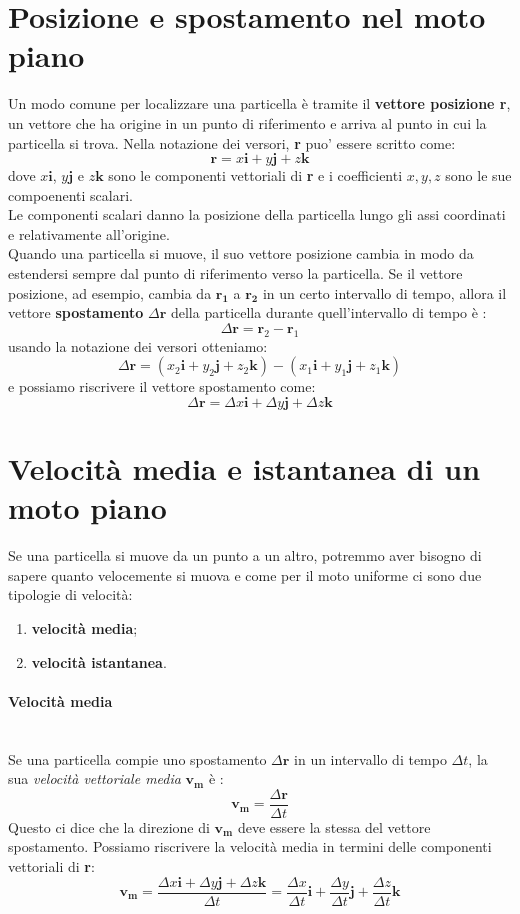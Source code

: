 \documentclass[12pt]{report}
\begin{document}
	\section{Posizione e spostamento nel moto piano}
	Un modo comune per localizzare una particella è  tramite il \textbf{vettore posizione r}, un vettore che ha origine in un punto di riferimento e arriva al punto in cui la particella si trova. Nella notazione dei versori, \textbf{r} puo' essere scritto come:
	\[
	\textbf{r} = x\textbf{i} + y\textbf{j} + z\textbf{k}
	\]
	dove $x\textbf{i}$, $y\textbf{j}$ e $z\textbf{k}$ sono le componenti vettoriali di \textbf{r} e i coefficienti $x, y, z$ sono le sue compoenenti scalari. \\
	Le componenti scalari danno la posizione della particella lungo gli assi coordinati e relativamente all'origine.\\
	Quando una particella si muove, il suo vettore posizione cambia in modo da estendersi sempre dal punto di riferimento verso la particella. Se il vettore posizione, ad esempio, cambia da $\mathbf{r_1}$ a $\mathbf{r_2}$ in un certo intervallo di tempo, allora il vettore \textbf{spostamento} $\Delta\textbf{r}$ della particella durante quell'intervallo di tempo è :
	\[
	\Delta\textbf{r} = \textbf{r}_2 - \textbf{r}_1
	\]
	usando la notazione dei versori otteniamo:
	\[
	\Delta \textbf{r} = (x_2\textbf{i}+y_2\textbf{j}+z_2\textbf{k}) - (x_1\textbf{i}+y_1\textbf{j}+z_1\textbf{k})
	\]
	e possiamo riscrivere il vettore spostamento come:
	\[
	\Delta \textbf{r} = \Delta x \textbf{i} + \Delta y \textbf{j} + \Delta z\textbf{k}
	\]
	\section{Velocità media e istantanea di un moto piano}
	Se una particella si muove da un punto a un altro, potremmo aver bisogno di sapere quanto velocemente si muova e come per il moto uniforme ci sono due tipologie di velocità:
	\begin{enumerate}
		\item \textbf{velocità media};
		\item \textbf{velocità istantanea}.
	\end{enumerate}
	\paragraph{Velocità media}\quad \\ Se una particella compie uno spostamento $\Delta \textbf{r}$ in un intervallo di tempo $\Delta t$, la sua \textit{velocità vettoriale media} $\mathbf{v_m}$ è :
	\[
	\mathbf{v_m} = \frac{\Delta \textbf{r}}{\Delta t}
	\]
	Questo ci dice che la direzione di $\mathbf{v_m}$ deve essere la stessa del vettore spostamento. Possiamo riscrivere la velocità media in termini delle componenti vettoriali di \textbf{r}:
	\[
	\mathbf{v_m} = \frac{\Delta x \textbf{i} + \Delta y \textbf{j} + \Delta z\textbf{k}}{\Delta t} = \frac{\Delta x}{\Delta t}\textbf{i} + \frac{\Delta y}{\Delta t}\textbf{j}+ \frac{\Delta z}{\Delta t}\textbf{k}
	\]
\end{document}
